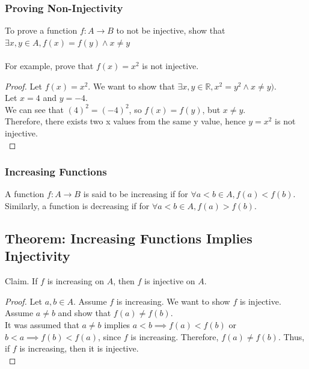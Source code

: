 \documentclass{article}
\begin{document}
\subsubsection{Proving Non-Injectivity}
To prove a function $f: A \rightarrow B$ to not be injective, show that $\exists x, y \in A, f(x) = f(y) \land x \neq y$\\
\\
For example, prove that $f(x) = x^2$ is not injective.\\
\begin{proof} Let $f(x) = x^2$. We want to show that $\exists x, y \in \mathbb{R}, x^2 = y^2 \land x \neq y)$.\\
Let $x = 4$ and $y = -4$.\\
We can see that $(4)^2 = (-4)^2$, so $f(x) = f(y)$, but $x \neq y$. \\
Therefore, there exists two x values from the same y value, hence $y = x^2$ is not injective.\\
\end{proof}
\subsubsection{Increasing Functions}
A function $f: A \rightarrow B$ is said to be increasing if for $\forall a < b \in A, f(a) < f(b)$.\\
Similarly, a function is decreasing if for $\forall a < b \in A, f(a) > f(b)$.
\subsection{Theorem: Increasing Functions Implies Injectivity}
Claim. If $f$ is increasing on $A$, then $f$ is injective on $A$.
\begin{proof} Let $a, b \in A$. Assume $f$ is increasing. We want to show  $f$ is injective. Assume $a \neq b$ and show that $f(a) \neq f(b)$.\\
It was assumed that $a \neq b$ implies $a < b \implies f(a) < f(b)$ or $b < a \implies f(b) < f(a)$, since $f$ is increasing. Therefore, $f(a) \neq f(b)$. Thus, if $f$ is increasing, then it is injective.\\
\end{proof}
\end{document}

